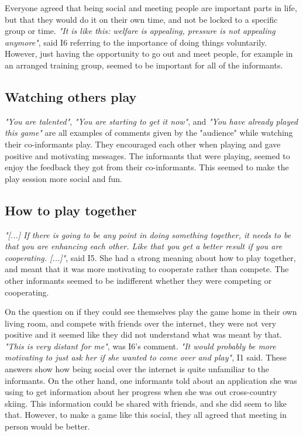 Everyone agreed that being social and meeting people are important parts in life, but that they would do it on their own time, and not be locked to a specific group or time. \emph{"It is like this: welfare is appealing, pressure is not appealing anymore"}, said I6 referring to the importance of doing things voluntarily. However, just having the opportunity to go out and meet people, for example in an arranged training group, seemed to be important for all of the informants. 

\subsection{Watching others play}
\emph{"You are talented"}, \emph{"You are starting to get it now"}, and \emph{"You have already played this game"} are all examples of comments given by the "audience" while watching their co-informants play. They encouraged each other when playing and gave positive and motivating messages. The informants that were playing, seemed to enjoy the feedback they got from their co-informants. This seemed to make the play session more social and fun.  

\subsection{How to play together}
\emph{"[...] If there is going to be any point in doing something together, it needs to be that you are enhancing each other. Like that you get a better result if you are cooperating. [...]"}, said I5. She had a strong meaning about how to play together, and meant that it was more motivating to cooperate rather than compete. The other informants seemed to be indifferent whether they were competing or cooperating.

On the question on if they could see themselves play the game home in their own living room, and compete with friends over the internet, they were not very positive and it seemed like they did not understand what was meant by that. \emph{"This is very distant for me"}, was I6's comment. \emph{"It would probably be more motivating to just ask her if she wanted to come over and play"}, I1 said. These answers show how being social over the internet is quite unfamiliar to the informants. On the other hand, one informants told about an application she was using to get information about her progress when she was out cross-country skiing. This information could be shared with friends, and she did seem to like that. However, to make a game like this social, they all agreed that meeting in person would be better.

